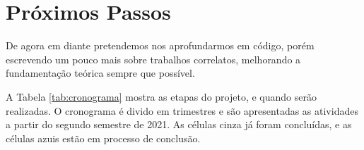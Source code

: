 \section{Próximos Passos}

De agora em diante pretendemos nos aprofundarmos em código, porém escrevendo um pouco mais sobre trabalhos correlatos, melhorando a fundamentação teórica sempre que possível.

\label{crono}

A Tabela \ref{tab:cronograma} mostra as etapas do projeto, e quando serão realizadas. O cronograma é divido em trimestres e são apresentadas as atividades a partir do segundo semestre de 2021. As células cinza já foram concluídas, e as células azuis estão em processo de conclusão.


